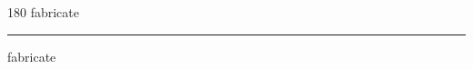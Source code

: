 
\begin{frame}
\begin{center}
\begin{turn}{180}
{\fontsize{2.5cm}{1em}\selectfont fabricate}
\end{turn}
\vspace{1em}\par  
\hrule
\vspace{1em}\par  
{\fontsize{2.5cm}{1em}\selectfont fabricate}
\end{center}
\end{frame}
